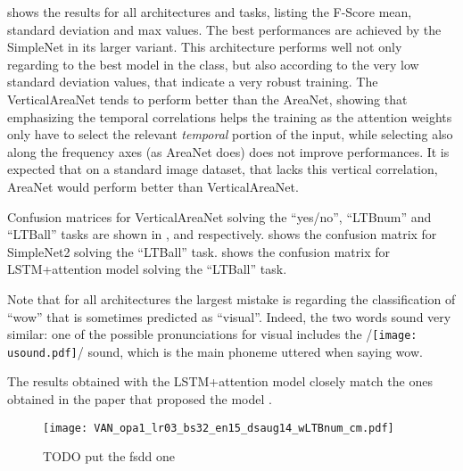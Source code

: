  shows the results for all architectures and tasks,
listing the F-Score mean, standard deviation and max values.
%
The best performances are achieved by the SimpleNet in its larger variant. This
architecture performs well not only regarding to the best model in the class,
but also according to the very low standard deviation values, that indicate a
very robust training.
%
The VerticalAreaNet tends to perform better than the AreaNet, showing that
emphasizing the temporal correlations helps the training as the attention
weights only have to select the relevant \textit{temporal} portion of the
input, while selecting also along the frequency axes (as AreaNet does) does not
improve performances.
%
It is expected that on a standard image dataset, that lacks this vertical
correlation, AreaNet would perform better than VerticalAreaNet.

% 


Confusion matrices for VerticalAreaNet solving the ``yes/no'', ``LTBnum'' and
``LTBall'' tasks are shown in ,
 and
 respectively.
%
 shows the confusion
matrix for SimpleNet2 solving the ``LTBall'' task.
%
shows the confusion matrix for LSTM+attention model solving the ``LTBall''
task.

Note that for all architectures the largest mistake is regarding
the classification of ``wow'' that is sometimes predicted as ``visual''.
Indeed, the two words sound very similar: one of the possible pronunciations
for visual includes the 
/\texttt{[image: usound.pdf]}/
sound,
which is the main phoneme uttered when saying wow.

The results obtained with the LSTM+attention model closely match the ones obtained in the
paper that proposed the model \cite{2018arXiv180808929C}.

\begin{figure}[t!]
    \centering
    \texttt{[image: VAN\_opa1\_lr03\_bs32\_en15\_dsaug14\_wLTBnum\_cm.pdf]}
    \caption{TODO put the fsdd one}%
    \label{fig:VAN_opa1_lr03_bs32_en15_dsaug14_wLTBnum_cm}
\end{figure}

